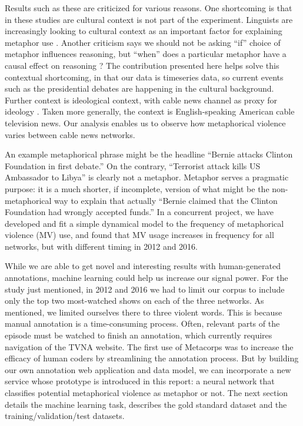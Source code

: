 \documentclass[11pt,letterpaper]{article}
\begin{document}
Results such as these are criticized for various reasons. 
One shortcoming is that in these studies are
cultural context is not part of the experiment. Linguists 
are increasingly looking to cultural context as
an important factor for explaining metaphor use \cite{Kovecses2010}. 
Another criticism
says we should not be asking ``if'' choice of metaphor influences
reasoning, but ``when'' does a particular metaphor have a causal effect
on reasoning \cite{Steen2014}? The contribution presented here helps solve
this contextual shortcoming, in that our data is timeseries data, so
current events such as the presidential debates are happening in the
cultural background. Further context is ideological context, with cable
news channel as proxy for ideology \cite{Mitchell2014, King2017}. Taken more
generally, the context is English-speaking American cable television news.
Our analysis enables us to observe how metaphorical violence varies between 
cable news networks.

An example metaphorical phrase might be the headline ``Bernie attacks
Clinton Foundation in first debate.'' On the contrary, ``Terrorist attack kills
US Ambassador to Libya'' is clearly not a metaphor. Metaphor serves a pragmatic
purpose: it is a much shorter, if incomplete, version of what might be
the non-metaphorical way to explain that actually ``Bernie claimed that
the Clinton Foundation had wrongly accepted funds.'' In a concurrent
project, we have developed and fit a simple dynamical model to the
frequency of metaphorical violence (MV) use, and found that MV usage
increases in frequency for all networks, but with different timing in
2012 and 2016.

While we are able to get novel and interesting results with
human-generated annotations, machine learning could help us increase our
signal power. For the study just mentioned, in 2012 and 2016 we had to
limit our corpus to include only the top two most-watched shows on each
of the three networks. As mentioned, we limited ourselves there to three
violent words. This is because manual annotation is a time-consuming
process. Often, relevant parts of the episode must be watched to finish
an annotation, which currently requires navigation of the TVNA website.
The first use of Metacorps was to increase the efficacy of human coders
by streamlining the annotation process. But by building our own
annotation web application and data model, we can incorporate a new
service whose prototype is introduced in this report: a neural network
that classifies potential metaphorical violence as metaphor or not. The
next section details the machine learning task, describes the gold
standard dataset and the training/validation/test datasets.
\end{document}
